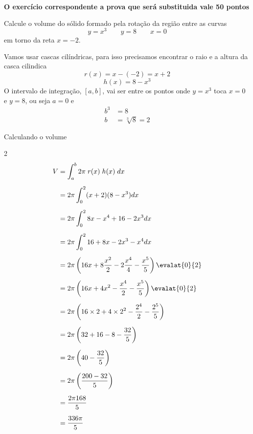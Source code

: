 \documentclass[a4paper,12pt,fleqn]{article}
\begin{document}

\textbf{O exercício correspondente a prova que será substituida vale 50 pontos}

Calcule o volume do sólido formado pela rotação da região entre as curvas
\[
  y = x^3 \qquad
  y = 8 \qquad
  x = 0
\]
em torno da reta \(x=-2\).

\begin{answer}
  Vamos usar cascas cilíndricas, para isso precisamos encontrar o raio e a
  altura da casca cilindica
  \[
    r(x) = x - (-2) = x + 2
  \]
  \[
    h(x) = 8 - x^3
  \]
  O intervalo de integração, \([a, b]\), vai ser entre os pontos onde \(y=x^3\) toca
  \(x=0\) e \(y=8\),
  ou seja \(a=0\) e
  \begin{align*}
    b^3 & = 8 \\
    b & = \sqrt[3]{8} = 2
  \end{align*}

  Calculando o volume
  \begin{multicols}{2}
  \begin{align*}
    V
    & = \int_a^b 2\pi \;r(x) \;h(x)\; dx  \\[2mm]
    & = 2\pi \int_0^2 (x+2) (8-x^3) dx  \\[2mm]
    & = 2\pi \int_0^2 8x - x^4 + 16 - 2x^3 dx  \\[2mm]
    & = 2\pi \int_0^2 16 + 8x - 2x^3 - x^4 dx  \\[2mm]
    & = 2\pi \left( 16x + 8\frac{x^2}{2} -2\frac{x^4}{4} - \frac{x^5}{5}\right) \evalat{0}{2}  \\[2mm]
    & = 2\pi \left( 16x + 4x^2 -\frac{x^4}{2} - \frac{x^5}{5}\right) \evalat{0}{2}  \\[2mm]
    & = 2\pi \left( 16\times 2 + 4\times 2^2 -\frac{2^4}{2} - \frac{2^5}{5}\right)  \\[2mm]
    & = 2\pi \left( 32 + 16 -8 - \frac{32}{5}\right)  \\[2mm]
    & = 2\pi \left( 40 - \frac{32}{5}\right)  \\[2mm]
    & = 2\pi \left( \frac{200 - 32}{5}\right) \\[2mm]
    & = \frac{2\pi 168}{5} \\[2mm]
    & = \frac{336\pi}{5}
  \end{align*}
  \end{multicols}
  \clearpage
\end{answer}
\end{document}

